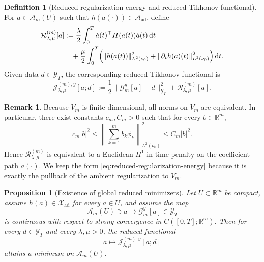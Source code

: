 \documentclass{article}
\newtheorem{proposition}[theorem]{Proposition}
\theoremstyle{definition}
\newtheorem{definition}[theorem]{Definition}
\newtheorem{remark}[theorem]{Remark}
\renewcommand{\d}{\mathrm{d}}
\begin{document}
\begin{definition}[Reduced regularization energy and reduced Tikhonov functional]
    \label{def:reduced-tikhonov-functional}
    For \(a\in \mathcal A_m(U)\) such that \(h(a(\cdot))\in \mathcal A_{\mathrm{ad}}\), define
    \begin{align}
        \label{eq:reduced-regularization-energy}
        \mathcal R_{\lambda,\mu}^{(m)}[a]
         & :=
        \frac{\lambda}{2}\int_0^T \dot a(t)^\top H(a(t))\dot a(t)\,\d t \notag \\
         & \quad
        +
        \frac{\mu}{2}\int_0^T
        \Bigl(
        \|h(a(t))\|_{L^2(\nu_0)}^2
        +
        \|\partial_t h(a)(t)\|_{L^2(\nu_0)}^2
        \Bigr)\,\d t .
    \end{align}
    Given data \(d\in \mathcal Y_T\), the corresponding reduced Tikhonov functional is
    \begin{equation}
        \label{eq:reduced-tikhonov}
        \mathcal J_{\lambda,\mu}^{(m),y}[a;d]
        :=
        \frac12\|\mathcal G_m^y[a]-d\|_{\mathcal Y_T}^2
        +
        \mathcal R_{\lambda,\mu}^{(m)}[a].
    \end{equation}
\end{definition}

\begin{remark}
    \label{rem:reduced-norm-equivalence-last-subsection}
    Because \(V_m\) is finite dimensional, all norms on \(V_m\) are equivalent. In particular, there
    exist constants \(c_m,C_m>0\) such that for every \(b\in\mathbb R^m\),
    \[
        c_m |b|^2
        \le
        \left\|\sum_{k=1}^m b_k\phi_k\right\|_{L^2(\nu_0)}^2
        \le
        C_m |b|^2.
    \]
    Hence \(\mathcal R_{\lambda,\mu}^{(m)}\) is equivalent to a Euclidean \(H^1\)-in-time penalty on the
    coefficient path \(a(\cdot)\). We keep the form \eqref{eq:reduced-regularization-energy} because
    it is exactly the pullback of the ambient regularization to \(V_m\).
\end{remark}

\begin{proposition}[Existence of global reduced minimizers]
    \label{prop:existence-local-reduced-minimizers}
    Let \(U\subset\mathbb R^m\) be compact, assume \(h(a)\in\mathcal X_{\mathrm{ad}}\) for every
    \(a\in U\), and assume the map
    \[
        \mathcal A_m(U)\ni a \longmapsto \mathcal G_m^y[a]\in \mathcal Y_T
    \]
    is continuous with respect to strong convergence in \(C([0,T];\mathbb R^m)\). Then for every
    \(d\in \mathcal Y_T\) and every \(\lambda,\mu>0\), the reduced functional
    \[
        a\longmapsto \mathcal J_{\lambda,\mu}^{(m),y}[a;d]
    \]
    attains a minimum on \(\mathcal A_m(U)\).
\end{proposition}
\end{document}
